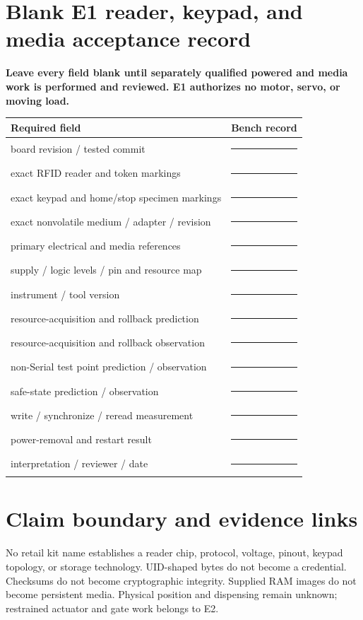 \documentclass[11pt]{article}
\newcommand{\blankline}{\rule{0.9in}{0.4pt}}
\begin{document}
\newpage
\small
\section{Blank E1 reader, keypad, and media acceptance record}
\textbf{Leave every field blank until separately qualified powered and media
work is performed and reviewed. E1 authorizes no motor, servo, or moving load.}

\begin{tabularx}{\linewidth}{@{}l X@{}}
\toprule
Required field & Bench record\\
\midrule
board revision / tested commit & \blankline\\[5pt]
exact RFID reader and token markings & \blankline\\[5pt]
exact keypad and home/stop specimen markings & \blankline\\[5pt]
exact nonvolatile medium / adapter / revision & \blankline\\[5pt]
primary electrical and media references & \blankline\\[5pt]
supply / logic levels / pin and resource map & \blankline\\[5pt]
instrument / tool version & \blankline\\[5pt]
resource-acquisition and rollback prediction & \blankline\\[5pt]
resource-acquisition and rollback observation & \blankline\\[5pt]
non-Serial test point prediction / observation & \blankline\\[5pt]
safe-state prediction / observation & \blankline\\[5pt]
write / synchronize / reread measurement & \blankline\\[5pt]
power-removal and restart result & \blankline\\[5pt]
interpretation / reviewer / date & \blankline\\
\bottomrule
\end{tabularx}

\section{Claim boundary and evidence links}
No retail kit name establishes a reader chip, protocol, voltage, pinout,
keypad topology, or storage technology. UID-shaped bytes do not become a
credential. Checksums do not become cryptographic integrity. Supplied RAM
images do not become persistent media. Physical position and dispensing
remain unknown; restrained actuator and gate work belongs to E2.
\end{document}
